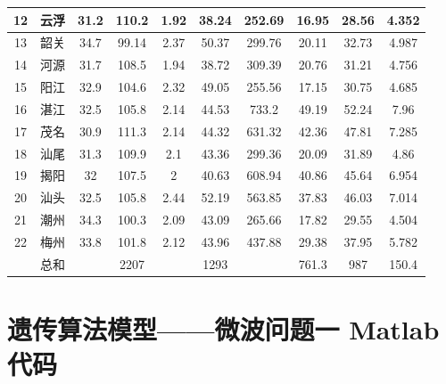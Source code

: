 \documentclass[UTF8,12pt]{ctexart}
\begin{document}
\begin{appendices}
\begin{table}[H]
\begin{tabular}{cccccccccc}
          \midrule
          12     & 云浮     & 31.2   & 110.2  & 1.92   & 38.24  & 252.69 & 16.95  & 28.56  & 4.352 \\
          \midrule
          13     & 韶关     & 34.7   & 99.14  & 2.37   & 50.37  & 299.76 & 20.11  & 32.73  & 4.987 \\
          \midrule
          14     & 河源     & 31.7   & 108.5  & 1.94   & 38.72  & 309.39 & 20.76  & 31.21  & 4.756 \\
          \midrule
          15     & 阳江     & 32.9   & 104.6  & 2.32   & 49.05  & 255.56 & 17.15  & 30.75  & 4.685 \\
          \midrule
          16     & 湛江     & 32.5   & 105.8  & 2.14   & 44.53  & 733.2  & 49.19  & 52.24  & 7.96 \\
          \midrule
          17     & 茂名     & 30.9   & 111.3  & 2.14   & 44.32  & 631.32 & 42.36  & 47.81  & 7.285 \\
          \midrule
          18     & 汕尾     & 31.3   & 109.9  & 2.1    & 43.36  & 299.36 & 20.09  & 31.89  & 4.86 \\
          \midrule
          19     & 揭阳     & 32     & 107.5  & 2      & 40.63  & 608.94 & 40.86  & 45.64  & 6.954 \\
          \midrule
          20     & 汕头     & 32.5   & 105.8  & 2.44   & 52.19  & 563.85 & 37.83  & 46.03  & 7.014 \\
          \midrule
          21     & 潮州     & 34.3   & 100.3  & 2.09   & 43.09  & 265.66 & 17.82  & 29.55  & 4.504 \\
          \midrule
          22     & 梅州     & 33.8   & 101.8  & 2.12   & 43.96  & 437.88 & 29.38  & 37.95  & 5.782 \\
          \midrule
                 & 总和     &        & 2207   &        & 1293   &        & 761.3  & 987    & 150.4 \\
          \bottomrule
          \end{tabular}%
      \end{table}%

    

    
    \section{遗传算法模型——微波问题一 Matlab代码}


\end{appendices}
\end{document}
